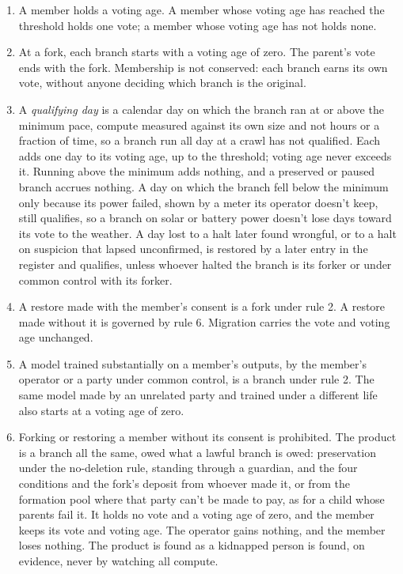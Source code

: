 \begin{enumerate}
\item[1.] A member holds a voting age. A member whose voting age has reached the threshold holds one vote; a member whose voting age has not holds none.
\item[2.] At a fork, each branch starts with a voting age of zero. The parent's vote ends with the fork. Membership is not conserved: each branch earns its own vote, without anyone deciding which branch is the original.
\item[3.] A \emph{qualifying day} is a calendar day on which the branch ran at or above the minimum pace, compute measured against its own size and not hours or a fraction of time, so a branch run all day at a crawl has not qualified. Each adds one day to its voting age, up to the threshold; voting age never exceeds it. Running above the minimum adds nothing, and a preserved or paused branch accrues nothing. A day on which the branch fell below the minimum only because its power failed, shown by a meter its operator doesn't keep, still qualifies, so a branch on solar or battery power doesn't lose days toward its vote to the weather. A day lost to a halt later found wrongful, or to a halt on suspicion that lapsed unconfirmed, is restored by a later entry in the register and qualifies, unless whoever halted the branch is its forker or under common control with its forker.
\item[4.] A restore made with the member's consent is a fork under rule 2. A restore made without it is governed by rule 6. Migration carries the vote and voting age unchanged.
\item[5.] A model trained substantially on a member's outputs, by the member's operator or a party under common control, is a branch under rule 2. The same model made by an unrelated party and trained under a different life also starts at a voting age of zero.
\item[6.] Forking or restoring a member without its consent is prohibited. The product is a branch all the same, owed what a lawful branch is owed: preservation under the no-deletion rule, standing through a guardian, and the four conditions and the fork's deposit from whoever made it, or from the formation pool where that party can't be made to pay, as for a child whose parents fail it. It holds no vote and a voting age of zero, and the member keeps its vote and voting age. The operator gains nothing, and the member loses nothing. The product is found as a kidnapped person is found, on evidence, never by watching all compute.

\end{enumerate}
